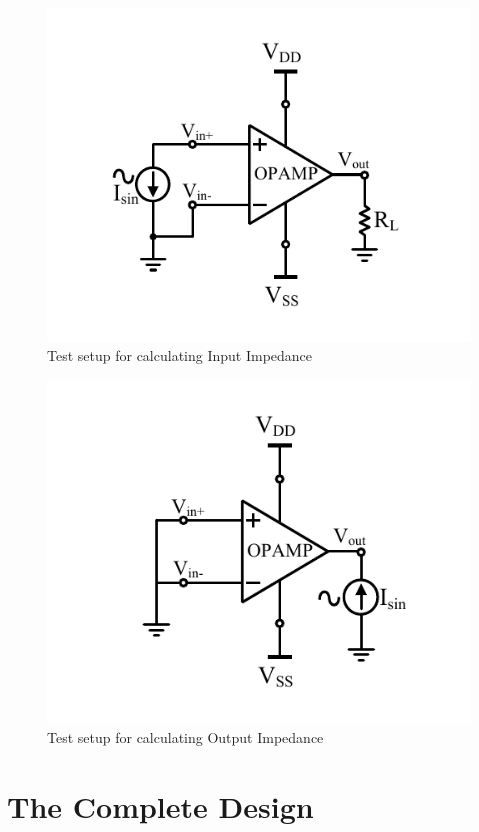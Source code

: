 \begin{figure} [H]
\centering
\includegraphics[scale=1]{Figures/Test_Benches/OPAMP/OPAMP_Zin.pdf}
\caption{Test setup for calculating Input Impedance}
\end{figure}

\begin{figure} [H]
\centering
\includegraphics[scale=1]{Figures/Test_Benches/OPAMP/OPAMP_Zout.pdf}
\caption{Test setup for calculating Output Impedance}
\end{figure}

\section{The Complete Design}

